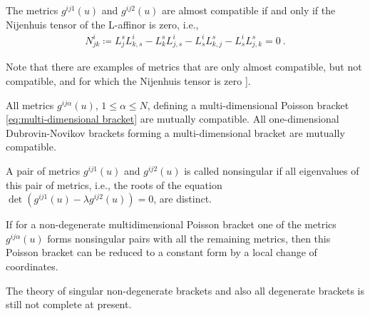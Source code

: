 \begin{theorem}
    The metrics $g^{ij1}(u)$ and $g^{ij2}(u)$ are almost compatible if and only if the Nijenhuis tensor of the L-affinor is zero, i.e.,
    \begin{align}
        N^i_{jk} \coloneqq L^s_j L^{i}_{k,s} - L^s_k L^{i}_{j,s} - L^i_s L^s_{k,j} - L^i_s L^s_{j,k} = 0 \:.
    \end{align}
\end{theorem}

Note that there are examples of metrics that are only almost compatible, but not compatible, and for which the Nijenhuis tensor is zero \cite{Mochov-compatibility}]. 

\begin{theorem} 
    All metrics $g^{ij \alpha}(u)$, $1 \leq \alpha \leq N$, defining a multi-dimensional Poisson bracket \eqref{eq:multi-dimensional bracket} are mutually compatible. All one-dimensional Dubrovin-Novikov brackets forming a multi-dimensional bracket are mutually compatible.
\end{theorem}

\begin{definition}
    A pair of metrics $g^{ij 1}(u)$ and $g^{ij 2}(u)$ is called nonsingular if all eigenvalues of this pair of metrics, i.e., the roots of the equation $\det (g^{ij 1}(u)- \lambda g^{ij 2}(u)) = 0$, are distinct.
\end{definition}

\begin{theorem}
    If for a non-degenerate multidimensional Poisson bracket one of the metrics $g^{ij \alpha}(u)$ forms nonsingular pairs with all the remaining metrics, then this Poisson bracket can be reduced to a constant form by a local change of coordinates.
\end{theorem}

The theory of singular non-degenerate brackets  and also all degenerate brackets is still not complete at present. 